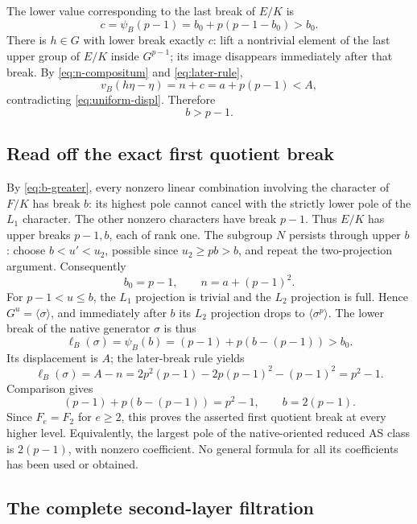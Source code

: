 The lower value corresponding to the last break of \(E/K\) is
\[
 c=\psi_B(p-1)=b_0+p(p-1-b_0)>b_0.
\]
There is \(h\in G\) with lower break exactly \(c\):
lift a nontrivial element of the last upper group of \(E/K\)
inside \(G^{p-1}\); its image disappears immediately after
that break. By \eqref{eq:n-compositum} and
\eqref{eq:later-rule},
\[
 v_B(h\eta-\eta)=n+c=a+p(p-1)<A,
\]
contradicting \eqref{eq:uniform-displ}. Therefore
\begin{equation}\label{eq:b-greater}
 b>p-1.
\end{equation}

\subsection{Read off the exact first quotient break}

By \eqref{eq:b-greater}, every nonzero linear combination
involving the character of \(F/K\) has break \(b\): its
highest pole cannot cancel with the strictly lower pole
of the \(L_1\) character. The other nonzero characters
have break \(p-1\). Thus \(E/K\) has upper breaks
\(p-1,b\), each of rank one.
The subgroup \(N\) persists through upper \(b\): choose
\(b<u'<u_2\), possible since \(u_2\ge pb>b\), and repeat
the two-projection argument.
Consequently
\[
 b_0=p-1,\qquad n=a+(p-1)^2.
\]
For \(p-1<u\le b\), the \(L_1\) projection is trivial
and the \(L_2\) projection is full. Hence
\(G^u=\langle\sigma\rangle\), and immediately after \(b\)
its \(L_2\) projection drops to \(\langle\sigma^p\rangle\).
The lower break of the native generator \(\sigma\) is thus
\[
 \ell_B(\sigma)=\psi_B(b)
 =(p-1)+p(b-(p-1))>b_0 .
\]
Its displacement is \(A\); the later-break rule yields
\[
 \ell_B(\sigma)=A-n
 =2p^2(p-1)-2p(p-1)^2-(p-1)^2=p^2-1.
\]
Comparison gives
\begin{equation}\label{eq:exact-first-break}
 (p-1)+p(b-(p-1))=p^2-1,\qquad b=2(p-1).
\end{equation}
Since \(F_e=F_2\) for \(e\ge2\), this proves the asserted
first quotient break at every higher level. Equivalently,
the largest pole of the native-oriented reduced AS class
is \(2(p-1)\), with nonzero coefficient. No general
formula for all its coefficients has been used or obtained.

\subsection{The complete second-layer filtration}

